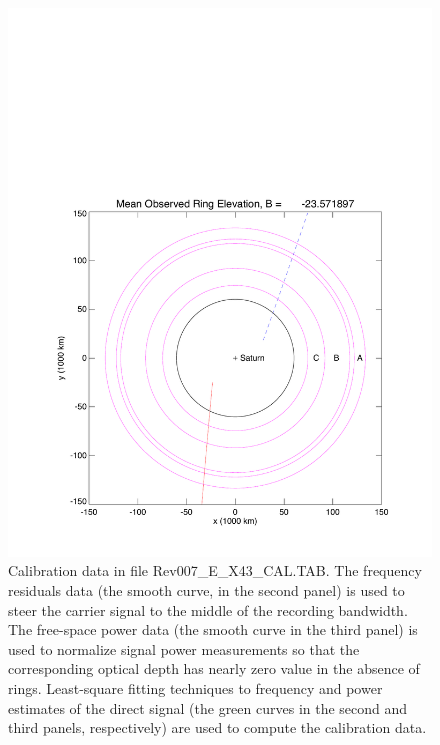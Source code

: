 \documentclass[crop=false,class=book]{standalone}
\begin{document}
\begin{figure}[H]
    \centering
    \includegraphics[page=4,trim = {0.67in 0.5in 0.45in 0.5in},clip,width=\textwidth]{Rev007_E_X43_summary_p1_08FEB2018.pdf}
	    \caption[Calibration Data contained in the Easy Data]{Calibration data in file Rev007\_E\_X43\_CAL.TAB. The frequency residuals data (the smooth curve, in the second panel) is used to steer the carrier signal to the middle of the recording bandwidth. The free-space power data (the smooth curve in the third panel) is used to normalize signal power measurements so that the corresponding optical depth has nearly zero value in the absence of rings. Least-square fitting techniques to frequency and power estimates of the direct signal (the green curves in the second and third panels, respectively) are used to compute the calibration data.}
\end{figure}
\end{document}
